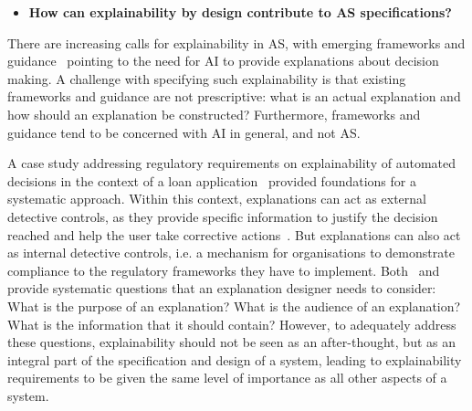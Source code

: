 \documentclass[sigconf,nonacm]{acmart}%
\begin{document}
	
	\begin{itemize}[leftmargin=0.5cm]
		\item \textbf{How can explainability by design contribute to AS specifications?}
	\end{itemize} 	
	There are increasing calls for explainability in AS, with emerging frameworks and guidance~\cite{Hamon:2020} pointing to the need for AI to provide explanations about decision making. A challenge with specifying such explainability is that existing frameworks and guidance are not prescriptive: what is an actual explanation and how should an explanation be constructed? Furthermore, frameworks and guidance tend to be concerned with AI in general, and not AS.
	
	A case study addressing regulatory requirements on explainability of automated decisions in the context of a loan application~\cite{Huynh:DGOV21} provided foundations for a systematic approach. Within this context, explanations can act as external detective controls, as they provide
	specific information to justify the decision reached and help the user take corrective actions~\cite{Tsakalakis:CLSR21}. But explanations can also act as internal detective controls, i.e. a mechanism for organisations to demonstrate compliance to the regulatory frameworks they have to implement. 
	Both~\cite{Huynh:DGOV21} and~\cite{Tsakalakis:CLSR21} provide systematic questions that an explanation designer needs to consider: What is the purpose of an explanation? What is the audience of an explanation? What is the information that it should contain? However, to adequately address these questions, explainability should not be seen as an after-thought, but as an integral part of the specification and design of a system, leading to explainability requirements to be given the same level of importance as all other aspects of a system. 
	
\end{document}
